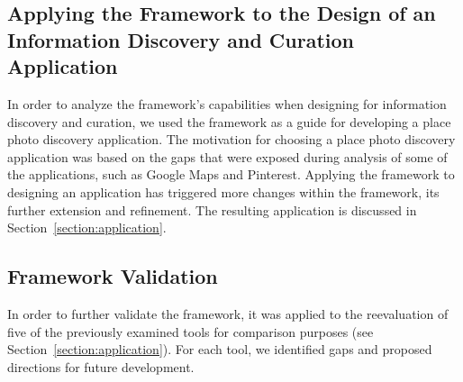\documentclass{sigchi}
\begin{document}
{\subsection{Applying the Framework to the Design of an Information Discovery and Curation Application}
\label{section:applying}

In order to analyze the framework's capabilities when designing for information discovery and curation, we used the framework as a guide for developing a place photo discovery application. The motivation for choosing a place photo discovery application was based on the gaps that were exposed during analysis of some of the applications, such as Google Maps and Pinterest. Applying the framework to designing an application has triggered more changes within the framework, its further extension and refinement. The resulting application is discussed in Section~\ref{section:application}.
}%

{\subsection{Framework Validation}
\label{section:validating}
In order to further validate the framework, it was applied to the reevaluation of five of the previously examined tools for comparison purposes (see Section~\ref{section:application}). For each tool, we identified gaps and proposed directions for future development. 
}%
\end{document}
